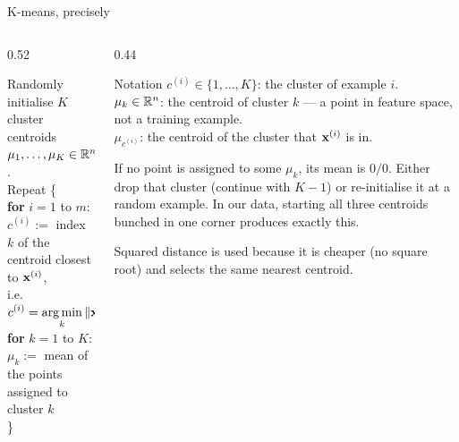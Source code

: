 \documentclass[aspectratio=169,10pt]{beamer}
\begin{document}
\begin{frame}{K-means, precisely}
  \begin{columns}[T,onlytextwidth]
    \begin{column}{0.52\textwidth}
      \begin{defnbox}[K-means]
        \small
        Randomly initialise $K$ cluster centroids $\mu_1,\dots,\mu_K\in\mathbb{R}^n$.\\[2pt]
        Repeat \{\\[1pt]
        \hspace*{1em}\textbf{for} $i=1$ to $m$:\\
        \hspace*{2em}$c^{(i)}:=$ index $k$ of the centroid closest to $\mathbf{x}^{(i)}$,\\
        \hspace*{2em}i.e.\ $\displaystyle c^{(i)}=\operatorname*{arg\,min}_k \|\mathbf{x}^{(i)}-\mu_k\|^2$\\[2pt]
        \hspace*{1em}\textbf{for} $k=1$ to $K$:\\
        \hspace*{2em}$\mu_k:=$ mean of the points assigned to cluster $k$\\
        \}
      \end{defnbox}
    \end{column}
    \begin{column}{0.44\textwidth}
      \footnotesize
      \begin{block}{Notation}
        $c^{(i)}\in\{1,\dots,K\}$: the cluster of example $i$.\\
        $\mu_k\in\mathbb{R}^n$: the centroid of cluster $k$ --- a point in feature space, not a
        training example.\\
        $\mu_{c^{(i)}}$: the centroid of the cluster that $\mathbf{x}^{(i)}$ is in.
      \end{block}
      \begin{pitfall}
        \footnotesize If no point is assigned to some $\mu_k$, its mean is $0/0$. Either
        drop that cluster (continue with $K-1$) or re-initialise it at a random example.
        In our data, starting all three centroids bunched in one corner produces exactly
        this.
      \end{pitfall}
      Squared distance is used because it is cheaper (no square root) and selects the same
      nearest centroid.
    \end{column}
  \end{columns}
\end{frame}
\end{document}
